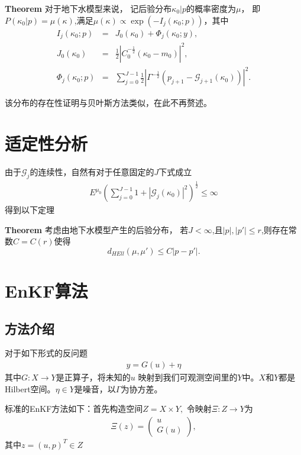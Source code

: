 \documentclass[a4paper,12pt,oneside,CJK]{cctbook}
\theoremstyle{definition}
\numberwithin{equation}{section}
\begin{document}
\textbf{Theorem} 对于地下水模型来说，
记后验分布$\kappa_0|p$的概率密度为$\mu$，
即$P(\kappa_0|p)=\mu(\kappa)$,满足$\mu(\kappa)\propto \exp(-I_j(\kappa_0;p))$，其中
\begin{eqnarray*}
   I_j(\kappa_0;p)&=&J_0(\kappa_0)+\Phi_j(\kappa_0;y),\\
   J_0(\kappa_0)&=&\frac{1}{2}|C_0^{-\frac{1}{2}}(\kappa_0-m_0)|^2,\\
   \Phi_j(\kappa_0;p)&=&\sum_{j=0}^{J-1}\frac{1}{2}|\Gamma^{-\frac{1}{2}}(p_{j+1}-\mathcal{G}_{j+1}(\kappa_0))|^2.
\end{eqnarray*}

该分布的存在性证明与贝叶斯方法类似，在此不再赘述。

\section{适定性分析}

由于$\mathcal{G}_j$的连续性，自然有对于任意固定的$J$下式成立
\begin{eqnarray*}
   E^{\mu_0}(\sum_{j=0}^{J-1}1+|\mathcal{G}_j(\kappa_0)|^2)^{\frac{1}{2}}\leq \infty
\end{eqnarray*}
得到以下定理

\textbf{Theorem} 考虑由地下水模型产生的后验分布，
若$J<\infty$,且$|p|,|p'|\leq r$,则存在常数$C=C(r)$使得
$$d_{HEll}(\mu,\mu')\leq C|p-p'|.$$


\section{EnKF算法}

\subsection{方法介绍}

对于如下形式的反问题
\begin{eqnarray*}
    y=G(u)+\eta
\end{eqnarray*}
其中$G:X\rightarrow Y$是正算子，将未知的$u$
映射到我们可观测空间里的$Y$中。$X$和$Y$都是
Hilbert空间。$\eta\in Y$是噪音，以$\Gamma$为协方差。

标准的EnKF方法如下：首先构造空间$Z=X\times Y,$
令映射$\Xi:Z\rightarrow Y$为
\begin{eqnarray*}
   \Xi(z)=
    \left(
       \begin{array}{ll}
         u\\
         G(u)
       \end{array}
     \right),
\end{eqnarray*}
其中$z=(u,p)^T\in Z$
\end{document}
